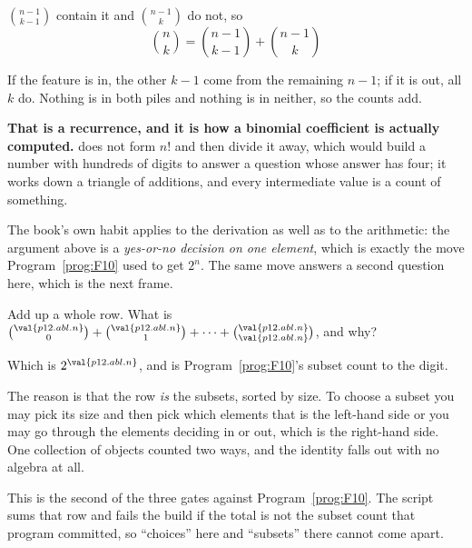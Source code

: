 \begin{fr}
\begin{ansblock}
$\binom{n-1}{k-1}$ contain it and $\binom{n-1}{k}$ do not, so
\[ \binom{n}{k} = \binom{n-1}{k-1} + \binom{n-1}{k} \]
\end{ansblock}

If the feature is in, the other $k-1$ come from the remaining $n-1$; if it is
out, all $k$ do. Nothing is in both piles and nothing is in neither, so the
counts add.

\textbf{That is a recurrence, and it is how a binomial coefficient is actually
computed.}  does not form $n!$ and then divide it away, which
would build a number with hundreds of digits to answer a question whose answer
has four; it works down a triangle of additions, and every intermediate value
is a count of something.

The book's own habit applies to the derivation as well as to the arithmetic:
the argument above is a \emph{yes-or-no decision on one element}, which is
exactly the move Program~\ref{prog:F10} used to get $2^{n}$. The same move
answers a second question here, which is the next frame.
\end{fr}

\begin{fr}
Add up a whole row. What is
$\binom{\val{p12.abl.n}}{0} + \binom{\val{p12.abl.n}}{1} + \cdots +
\binom{\val{p12.abl.n}}{\val{p12.abl.n}}$, and why?
\dotline
\nextframe
\end{fr}

\begin{fr}
Which is $2^{\val{p12.abl.n}}$, and is Program~\ref{prog:F10}'s subset count
to the digit.

The reason is that the row \emph{is} the subsets, sorted by size. To choose a
subset you may pick its size and then pick which elements \dash{} that is the
left-hand side \dash{} or you may go through the elements deciding in or out,
which is the right-hand side. One collection of objects counted two ways, and
the identity falls out with no algebra at all.

\begin{note}
This is the second of the three gates against Program~\ref{prog:F10}. The
script sums that row and fails the build if the total is not the subset count
that program committed, so \enquote{choices} here and \enquote{subsets} there
cannot come apart.
\end{note}
\end{fr}

